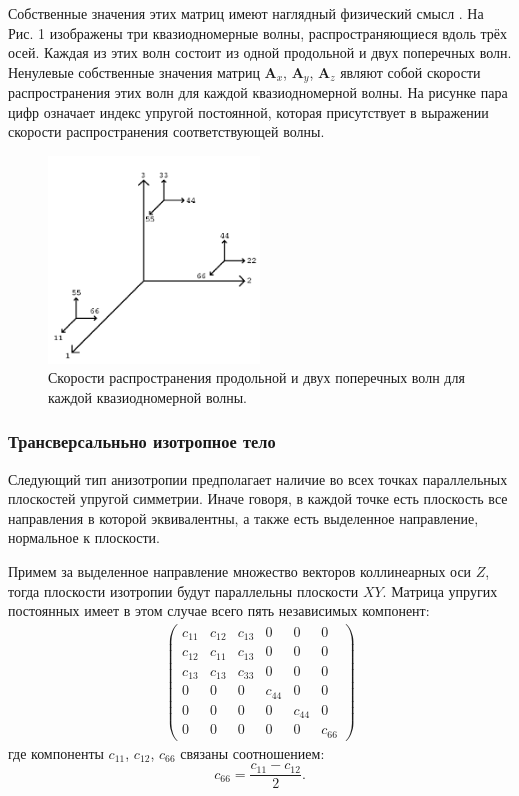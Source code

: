 	Собственные значения этих матриц имеют наглядный физический смысл \cite{favorskaya}. 
	На Рис. 1 изображены три квазиодномерные волны, распространяющиеся вдоль трёх осей.
	Каждая из этих волн состоит из одной продольной и двух поперечных волн.
	Ненулевые собственные значения матриц $\mathbf{A}_x$, $\mathbf{A}_y$, $\mathbf{A}_z$ являют собой скорости распространения этих волн для каждой квазиодномерной волны.
	На рисунке пара цифр означает индекс упругой постоянной, которая присутствует в выражении скорости распространения соответствующей волны.
\begin{figure}[H]
\centerline{\includegraphics[width=0.5\textwidth]{png/speeds.png}}
\caption{Скорости распространения продольной и двух поперечных волн для каждой квазиодномерной волны.}
\label{pic:speeds-waves}
\end{figure}

\subsubsection{Трансверсальньно изотропное тело}
	
	Следующий тип анизотропии предполагает наличие во всех точках параллельных плоскостей упругой симметрии\cite{lehnitsky}.
	Иначе говоря, в каждой точке есть плоскость все направления в которой эквивалентны, а также есть выделенное направление, нормальное к плоскости.
	
	Примем за выделенное направление множество векторов коллинеарных оси $Z$, тогда плоскости изотропии будут параллельны плоскости $XY$.
	Матрица упругих постоянных имеет в этом случае всего пять независимых компонент:
\begin{align}
\label{vert_trans_tensor}
\left( \begin{array}{cccccccccccc}
c_{11} & c_{12} & c_{13} & 0 & 0 & 0 \\ 
c_{12} & c_{11} & c_{13} & 0 & 0 & 0 \\ 
c_{13} & c_{13} & c_{33} & 0 & 0 & 0 \\ 
0 & 0 & 0 & c_{44} & 0 & 0 \\ 
0 & 0 & 0 & 0 & c_{44} & 0 \\ 
0 & 0 & 0 & 0 & 0 & c_{66}
\end{array} \right){}
\end{align}
	где компоненты $c_{11}$, $c_{12}$, $c_{66}$ связаны соотношением:
\begin{equation}
	c_{66} = \frac{c_{11} - c_{12}}{2}.
\end{equation}


